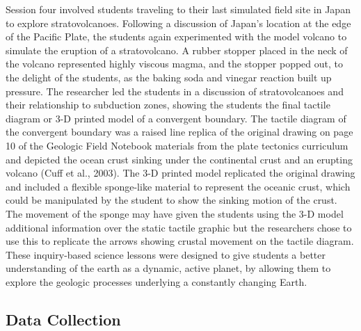 \documentclass[11.5pt]{sig-alternate} %
\begin{document}
\begin{large}
Session four involved students traveling to their last simulated field site in Japan to explore stratovolcanoes.  Following a discussion of Japan’s location at the edge of the Pacific Plate, the students again experimented with the model volcano to simulate the eruption of a stratovolcano.  A rubber stopper placed in the neck of the volcano represented highly viscous magma, and the stopper popped out, to the delight of the students, as the baking soda and vinegar reaction built up pressure.  The researcher led the students in a discussion of stratovolcanoes and their relationship to subduction zones, showing the students the final tactile diagram or 3-D printed model of a convergent boundary.  The tactile diagram of the convergent boundary was a raised line replica of the original drawing on page 10 of the Geologic Field Notebook materials from the plate tectonics curriculum and depicted the ocean crust sinking under the continental crust and an erupting volcano (Cuff et al., 2003).  The 3-D printed model replicated the original drawing and included a flexible sponge-like material to represent the oceanic crust, which could be manipulated by the student to show the sinking motion of the crust.  The movement of the sponge may have given the students using the 3-D model additional information over the static tactile graphic but the researchers chose to use this to replicate the arrows showing crustal movement on the tactile diagram.  These inquiry-based science lessons were designed to give students a better understanding of the earth as a dynamic, active planet, by allowing them to explore the geologic processes underlying a constantly changing Earth.  

\subsection*{Data Collection}


\end{large}
\end{document}
